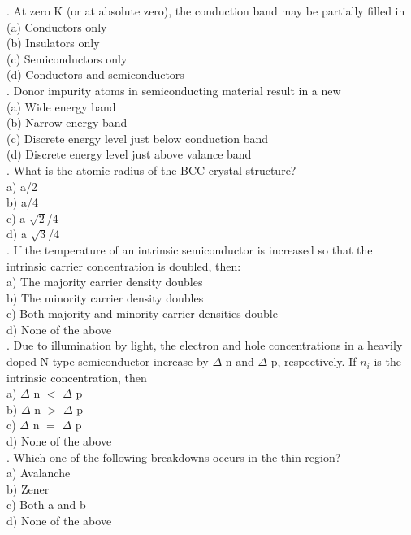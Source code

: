 \documentclass[12pt]{article}\date{}
\begin{document}
. At zero K (or at absolute zero), the conduction band may be partially filled in \\
(a) Conductors only \\
(b) Insulators only \\
(c) Semiconductors only \\
(d) Conductors and semiconductors \\

. Donor impurity atoms in semiconducting material result in a new \\
(a) Wide energy band \\
(b) Narrow energy band \\
(c) Discrete energy level just below conduction band \\
(d) Discrete energy level just above valance band \\

. What is the atomic radius of the BCC crystal structure? \\
a) a/2 \\
b) a/4 \\
c) a $\sqrt2$/4 \\
d) a $\sqrt3$/4 \\

. If the temperature of an intrinsic semiconductor is increased so that the intrinsic carrier concentration is doubled, then: \\
a) The majority carrier density doubles \\
b) The minority carrier density doubles \\
c) Both majority and minority carrier densities double \\
d) None of the above \\

. Due to illumination by light, the electron and hole concentrations in a heavily doped N type semiconductor increase by $\Delta$ n and $\Delta$ p, respectively. If $n_i$ is the intrinsic concentration, then \\
a) $\Delta$ n $<$ $\Delta$ p \\
b) $\Delta$ n $>$ $\Delta$ p \\
c) $\Delta$ n $=$ $\Delta$ p \\
d)  None of the above \\

. Which one of the following breakdowns occurs in the thin region? \\
a) Avalanche \\
b) Zener \\
c) Both a and b \\
d) None of the above \\
\end{document}
